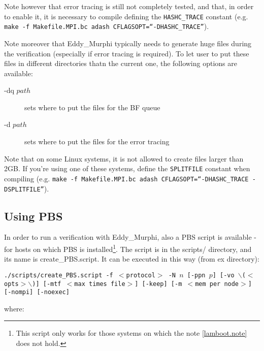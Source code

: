 \documentclass{article}
\begin{document}
Note however that error tracing is still not completely tested, and that, in
order to enable it, it is necessary to compile defining the {\tt HASHC\_TRACE}
constant (e.g. {\tt make -f Makefile.MPI.bc adash
CFLAGSOPT=``-DHASHC\_TRACE''}). 

Note moreover that Eddy\_Murphi typically needs to generate huge files during
the verification (especially if error tracing is required). To let user to put
these files in different directories thatn the current one, the following
options are available:

\begin{description}

	\item[-dq $path$] sets where to put the files for the BF queue

	\item[-d $path$] sets where to put the files for the error tracing

\end{description}

Note that on some Linux systems, it is not allowed to create files larger than
2GB. If you're using one of these systems, define the {\tt SPLITFILE} constant
when compiling (e.g. {\tt make -f Makefile.MPI.bc adash
CFLAGSOPT=``-DHASHC\_TRACE -DSPLITFILE''}).

\subsection{Using PBS}

In order to run a verification with Eddy\_Murphi, also a PBS script is available
- for hosts on which PBS is installed\footnote{This script only works for those
systems on which the note \ref{lamboot.note} does not hold.}. The script is in
the scripts/ directory, and its name is create\_PBS.script. It can be executed
in this way (from ex directory):

{\tt ./scripts/create\_PBS.script -f $<$protocol$>$ -N $n$ [-ppn $p$] [-vo
$\backslash$($<$opts$>$$\backslash$)] [-mtf $<$max times file$>$] [-keep] [-m
$<$mem per node$>$] [-nompi] [-noexec]}

where: 
\end{document}
